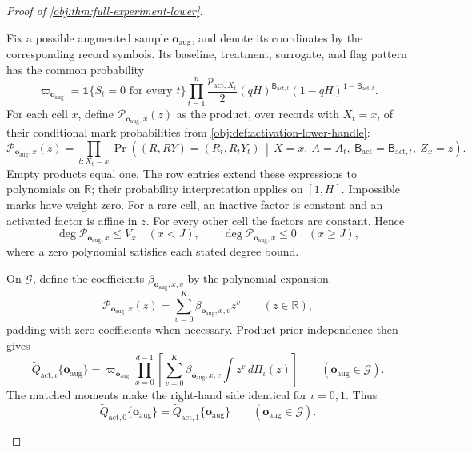 \begin{proof}[Proof of \cref{obj:thm:full-experiment-lower}]
\begin{enumerate}
Fix a possible augmented sample \(\mathbf o_{\mathrm{aug}}\), and denote its
coordinates by the corresponding record symbols. Its baseline, treatment,
surrogate, and flag pattern has the common probability
\[
\varpi_{\mathbf o_{\mathrm{aug}}}
=
\mathbf1\{S_t=0\text{ for every }t\}
\prod_{t=1}^{n}
\frac{p_{\mathrm{act},X_t}}2
(qH)^{\mathsf B_{\mathrm{act},t}}
(1-qH)^{1-\mathsf B_{\mathrm{act},t}}.
\]
For each cell \(x\), define \(\mathcal P_{\mathbf o_{\mathrm{aug}},x}(z)\)
as the product, over records with \(X_t=x\), of their conditional mark
probabilities from \cref{obj:def:activation-lower-handle}:
\[
\mathcal P_{\mathbf o_{\mathrm{aug}},x}(z)
=
\prod_{t:X_t=x}
\Pr\!\left(
(R,RY)=(R_t,R_tY_t)
\,\middle|\,
X=x,\ A=A_t,\ \mathsf B_{\mathrm{act}}=\mathsf B_{\mathrm{act},t},
\ Z_x=z
\right).
\]
Empty products equal one. The row entries extend these expressions to
polynomials on \(\mathbb R\); their probability interpretation applies on
\([1,H]\). Impossible marks have weight zero. For a rare cell, an inactive
factor is constant and an activated factor is affine in \(z\). For every
other cell the factors are constant. Hence
\[
\deg\mathcal P_{\mathbf o_{\mathrm{aug}},x}\le V_x
\quad(x<J),\qquad
\deg\mathcal P_{\mathbf o_{\mathrm{aug}},x}\le0
\quad(x\ge J),
\]
where a zero polynomial satisfies each stated degree bound.

On \(\mathcal G\), define the coefficients
\(\beta_{\mathbf o_{\mathrm{aug}},x,v}\) by the polynomial expansion
\[
\mathcal P_{\mathbf o_{\mathrm{aug}},x}(z)
=\sum_{v=0}^{K}
\beta_{\mathbf o_{\mathrm{aug}},x,v}z^v
\qquad(z\in\mathbb R),
\]
padding with zero coefficients when necessary. Product-prior independence
then gives
\[
\widetilde Q_{\mathrm{act},\iota}\{\mathbf o_{\mathrm{aug}}\}
=
\varpi_{\mathbf o_{\mathrm{aug}}}
\prod_{x=0}^{d-1}
\left[
\sum_{v=0}^{K}
\beta_{\mathbf o_{\mathrm{aug}},x,v}
\int z^v\,d\Pi_\iota(z)
\right]
\qquad(\mathbf o_{\mathrm{aug}}\in\mathcal G).
\]
The matched moments make the right-hand side identical for
\(\iota=0,1\). Thus
\[
\widetilde Q_{\mathrm{act},0}\{\mathbf o_{\mathrm{aug}}\}
=
\widetilde Q_{\mathrm{act},1}\{\mathbf o_{\mathrm{aug}}\}
\qquad(\mathbf o_{\mathrm{aug}}\in\mathcal G).
\]


\end{enumerate}
\end{proof}
